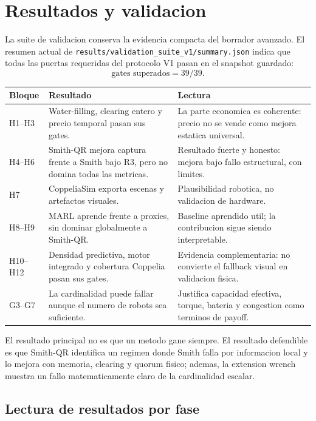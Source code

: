 ﻿\section{Resultados y validacion}

La suite de validacion conserva la evidencia compacta del borrador avanzado. El resumen
actual de \texttt{results/validation\_suite\_v1/summary.json} indica que todas las puertas
requeridas del protocolo V1 pasan en el snapshot guardado:
\[
  \text{gates superados} = 39/39.
\]

\begin{tabularx}{\textwidth}{@{}p{}X X@{}}
\toprule
Bloque & Resultado & Lectura \\
\midrule
H1--H3 & Water-filling, clearing entero y precio temporal pasan sus gates. &
La parte economica es coherente: precio no se vende como mejora estatica universal. \\
H4--H6 & Smith-QR mejora captura frente a Smith bajo R3, pero no domina todas las metricas. &
Resultado fuerte y honesto: mejora bajo fallo estructural, con limites. \\
H7 & CoppeliaSim exporta escenas y artefactos visuales. &
Plausibilidad robotica, no validacion de hardware. \\
H8--H9 & MARL aprende frente a proxies, sin dominar globalmente a Smith-QR. &
Baseline aprendido util; la contribucion sigue siendo interpretable. \\
H10--H12 & Densidad predictiva, motor integrado y cobertura Coppelia pasan sus gates. &
Evidencia complementaria: no convierte el fallback visual en validacion fisica. \\
G3--G7 & La cardinalidad puede fallar aunque el numero de robots sea suficiente. &
Justifica capacidad efectiva, torque, bateria y congestion como terminos de payoff. \\
\bottomrule
\end{tabularx}

El resultado principal no es que un metodo gane siempre. El resultado defendible es que
Smith-QR identifica un regimen donde Smith falla por informacion local y lo mejora con
memoria, clearing y quorum fisico; ademas, la extension wrench muestra un fallo
matematicamente claro de la cardinalidad escalar.

\subsection*{Lectura de resultados por fase}

